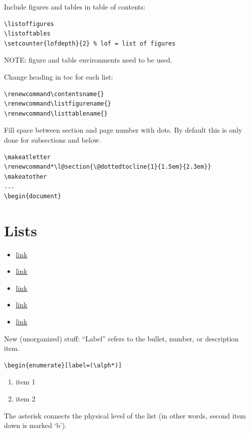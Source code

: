 \documentclass{article}
\makeatletter
\renewcommand*\l@section{\@dottedtocline{1}{1.5em}{2.3em}}
\makeatother
\begin{document}
Include figures and tables in table of contents:
\begin{lstlisting}
\listoffigures
\listoftables
\setcounter{lofdepth}{2} % lof = list of figures
\end{lstlisting}
NOTE: figure and table environments need to be used.

Change heading in toc for each list:
\begin{lstlisting}
\renewcommand\contentsname{}
\renewcommand\listfigurename{}
\renewcommand\listtablename{}
\end{lstlisting}

Fill space between section and page number with dots.
By default this is only done for subsections and below.
\begin{lstlisting}
\makeatletter
\renewcommand*\l@section{\@dottedtocline{1}{1.5em}{2.3em}}
\makeatother
...
\begin{document}
\end{lstlisting}


\clearpage
\section{Lists}\label{lists}
\begin{itemize}
    \item \href{ftp://ftp.nsu.ru/mirrors/ftp.dante.de/tex-archive/macros/latex/contrib/enumitem/enumitem.pdf}
        {link}
    \item \href{https://www.ntg.nl/maps/11/33.pdf}
        {link}
    \item \href{https://www.sharelatex.com/learn/Lists#Reference_guide}
        {link}
    \item \href{http://ctan.mirrors.hoobly.com/macros/latex/contrib/enumitem/enumitem.pdf}
        {link}
    \item \href{http://www.troubleshooters.com/linux/lyx/ownlists.htm}
        {link}
\end{itemize}

New (unorganized) stuff:
``Label'' refers to the bullet, number, or description item.
\begin{lstlisting}
\begin{enumerate}[label=(\alph*)]
\end{lstlisting}

\begin{enumerate}[label=(\alph*)]
    \item item 1
    \item item 2
\end{enumerate}
The asterisk connects the physical level of the list
(in other words, second item down is marked `b').
\end{document}
